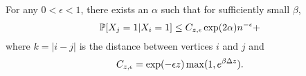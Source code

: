 \begin{lemma}
	For any $0 < \epsilon < 1$, there exists an $\alpha$ such that for sufficiently small $\beta$,
	\label{lem:nd X_j given X_i}
	\begin{equation}
		\mathbb{P}[X_j = 1| X_i = 1] \leq C_{z, \epsilon} \exp(2 \alpha) n^{-\epsilon} + 
	\end{equation}
	where $k = |i - j|$ is the distance between vertices $i$ and $j$ and
	\begin{equation}
		C_{z, \epsilon} = \exp(-\epsilon z) \max(1, e^{\beta\Delta z}).
	\end{equation}
\end{lemma}
